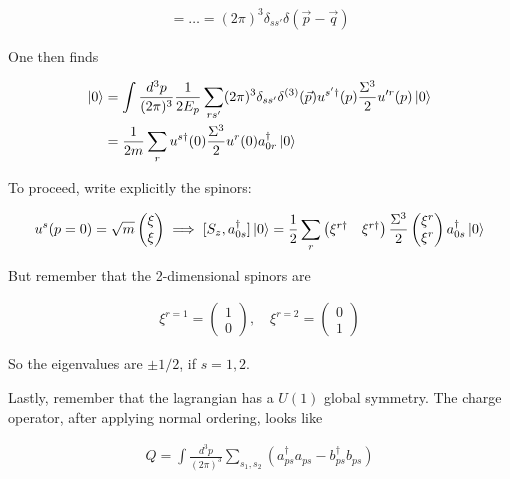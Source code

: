 \documentclass{report}
\begin{document}
\begin{align}
    [a_{p,r}^\dagger a_{qs'}, a_{0s}] = \ldots = (2\pi)^3\delta_{ss'}\delta(\vec{p}-\vec{q})
\end{align}

One then finds 

\begin{align}
    [S_z, a^\dagger_{0s}]\ket{0} &= \int \frac{d^3p}{(2\pi)^3}\frac{1}{2E_p}\sum_{r s'}(2\pi)^3 \delta_{ss'}\delta^{(3)}(\vec{p})u^{s'\dagger}(p)\frac{\Sigma^3}{2}u'^{r}(p)\ket{0} \\
    &= \frac{1}{2m}\sum_r u^{s\dagger}(0)\frac{\Sigma^3}{2}u^r(0)a^\dagger_{0r}\ket{0}
\end{align}

To proceed, write explicitly the spinors: 

\begin{align}
    u^s(p=0) = \sqrt{m}\begin{pmatrix}
        \xi \\ \xi 
    \end{pmatrix} \implies [S_z, a^\dagger_{0s}]\ket{0} = \frac{1}{2}\sum_r \begin{pmatrix}
        \xi^{r\dagger} & \xi^{r\dagger}
    \end{pmatrix} \frac{\Sigma^3}{2}\begin{pmatrix}
        \xi^r  \\ \xi^r
    \end{pmatrix}a^\dagger_{0s}\ket{0}
\end{align}

But remember that the 2-dimensional spinors are 

\begin{align}
    \xi^{r=1} = \begin{pmatrix}
        1 \\ 0
    \end{pmatrix}, \quad \xi^{r=2} = \begin{pmatrix}
        0 \\ 1 
    \end{pmatrix}
\end{align}

So the eigenvalues are \(\pm 1/2\), if \(s = 1, 2\).  

Lastly, remember that the lagrangian has a \(U(1)\) global symmetry. The charge operator, after applying normal ordering, looks like

\begin{align}
    Q = \int \frac{d^3p}{(2\pi)^3}\sum_{s_1, s_2}(a^\dagger_{ps}a_{ps} - b^\dagger_{ps}b_{ps})
\end{align}
\end{document}
